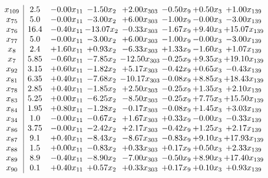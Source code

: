 \documentclass[8pt]{article}
\begin{document}
\[\begin{array}{c| c c@{\hskip 2pt} c@{\hskip 2pt} c@{\hskip 2pt} c@{\hskip 2pt} c@{\hskip 2pt} c@{\hskip 2pt} }
 x_{109}   &  2.5 & -0.00 x_{11} & -1.50 x_{2} & +  2.00 x_{303} & -0.50 x_{9} & +  0.50 x_{3} & +  1.00 x_{139}\\
 x_{75}   &  5.0 & -0.00 x_{11} & -3.00 x_{2} & +  6.00 x_{303} & -1.00 x_{9} & -0.00 x_{3} & -3.00 x_{139}\\
 x_{76}   &  16.4 & -0.40 x_{11} & -13.07 x_{2} & -0.33 x_{303} & -1.67 x_{9} & +  9.40 x_{3} & + 15.07 x_{139}\\
 x_{77}   &  5.0 & -0.00 x_{11} & -3.00 x_{2} & +  6.00 x_{303} & -1.00 x_{9} & -0.00 x_{3} & -3.00 x_{139}\\
 x_{8}   &  2.4 & +  1.60 x_{11} & +  0.93 x_{2} & -6.33 x_{303} & +  1.33 x_{9} & -1.60 x_{3} & +  1.07 x_{139}\\
 x_{7}   &  5.85 & -0.60 x_{11} & -7.85 x_{2} & -12.50 x_{303} & -0.25 x_{9} & +  9.35 x_{3} & + 19.10 x_{139}\\
 x_{92}   &  3.15 & +  0.60 x_{11} & -1.82 x_{2} & +  5.17 x_{303} & -0.42 x_{9} & +  0.65 x_{3} & -0.43 x_{139}\\
 x_{81}   &  6.35 & +  0.40 x_{11} & -7.68 x_{2} & -10.17 x_{303} & -0.08 x_{9} & +  8.85 x_{3} & + 18.43 x_{139}\\
 x_{78}   &  2.85 & +  0.40 x_{11} & -1.85 x_{2} & +  2.50 x_{303} & -0.25 x_{9} & +  1.35 x_{3} & +  2.10 x_{139}\\
 x_{83}   &  5.25 & +  0.00 x_{11} & -6.25 x_{2} & -8.50 x_{303} & -0.25 x_{9} & +  7.75 x_{3} & + 15.50 x_{139}\\
 x_{84}   &  1.95 & +  0.80 x_{11} & -1.28 x_{2} & -0.17 x_{303} & -0.08 x_{9} & +  1.45 x_{3} & +  3.03 x_{139}\\
 x_{34}   &  1.0 & -0.00 x_{11} & -0.67 x_{2} & +  1.67 x_{303} & +  0.33 x_{9} & -0.00 x_{3} & -0.33 x_{139}\\
 x_{86}   &  3.75 & -0.00 x_{11} & -2.42 x_{2} & +  2.17 x_{303} & -0.42 x_{9} & +  1.25 x_{3} & +  2.17 x_{139}\\
 x_{87}   &  9.1 & +  0.40 x_{11} & -8.43 x_{2} & -8.67 x_{303} & -0.83 x_{9} & +  9.10 x_{3} & + 17.93 x_{139}\\
 x_{88}   &  1.5 & +  0.00 x_{11} & -0.83 x_{2} & +  0.33 x_{303} & +  0.17 x_{9} & +  0.50 x_{3} & +  2.33 x_{139}\\
 x_{89}   &  8.9 & -0.40 x_{11} & -8.90 x_{2} & -7.00 x_{303} & -0.50 x_{9} & +  8.90 x_{3} & + 17.40 x_{139}\\
 x_{90}   &  0.1 & +  0.40 x_{11} & +  0.57 x_{2} & +  0.33 x_{303} & +  0.17 x_{9} & +  0.10 x_{3} & +  0.93 x_{139}\\

\end{array}\]
\end{document}

